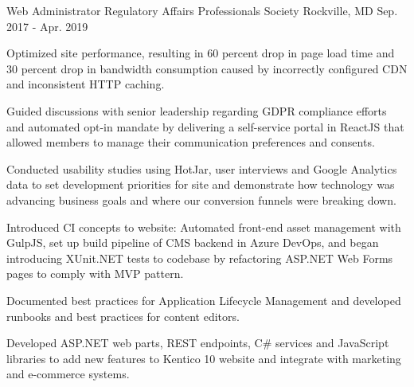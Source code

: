 \begin{cventries}
  \cventry
    {Web Administrator} %
    {Regulatory Affairs Professionals Society} %
    {Rockville, MD} %
    {Sep. 2017 - Apr. 2019} %
    {
      \begin{cvitems} %
		\item {Optimized site performance, resulting in 60 percent drop in page load time and 30 percent drop in bandwidth consumption caused by incorrectly configured CDN and inconsistent HTTP caching.}
		\item {Guided discussions with senior leadership regarding GDPR compliance efforts and automated opt-in mandate by delivering a self-service portal in ReactJS that allowed members to manage their communication preferences and consents.}
		\item {Conducted usability studies using HotJar, user interviews and Google Analytics data to set development priorities for site and demonstrate how technology was advancing business goals and where our conversion funnels were breaking down.}        
        \item {Introduced CI concepts to website: Automated front-end asset management with GulpJS, set up build pipeline of CMS backend in Azure DevOps, and began introducing XUnit.NET tests to codebase by refactoring ASP.NET Web Forms pages to comply with MVP pattern.}
        \item {Documented best practices for Application Lifecycle Management and developed runbooks and best practices for content editors.}
        \item {Developed ASP.NET web parts, REST endpoints, C\# services and JavaScript libraries to add new features to Kentico 10 website and integrate with marketing and e-commerce systems.}
      \end{cvitems}
    }


\end{cventries}
